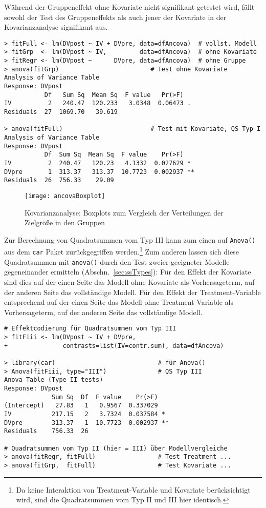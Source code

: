 Während der Gruppeneffekt ohne Kovariate nicht signifikant getestet wird, fällt sowohl der Test des Gruppeneffekts als auch jener der Kovariate in der Kovarianzanalyse signifikant aus. 
\begin{lstlisting}
> fitFull <- lm(DVpost ~ IV + DVpre, data=dfAncova)  # vollst. Modell
> fitGrp  <- lm(DVpost ~ IV,         data=dfAncova)  # ohne Kovariate
> fitRegr <- lm(DVpost ~      DVpre, data=dfAncova)  # ohne Gruppe
> anova(fitGrp)                         # Test ohne Kovariate
Analysis of Variance Table
Response: DVpost
           Df   Sum Sq  Mean Sq  F value   Pr(>F)
IV          2   240.47  120.233   3.0348  0.06473 .
Residuals  27  1069.70   39.619

> anova(fitFull)                        # Test mit Kovariate, QS Typ I
Analysis of Variance Table
Response: DVpost
           Df  Sum Sq  Mean Sq  F value    Pr(>F)
IV          2  240.47   120.23   4.1332  0.027629 *
DVpre       1  313.37   313.37  10.7723  0.002937 **
Residuals  26  756.33    29.09
\end{lstlisting}

\begin{figure}[ht]
\centering
\texttt{[image: ancovaBoxplot]}
\vspace*{-1em}
\caption{Kovarianzanalyse: Boxplots zum Vergleich der Verteilungen der Zielgröße in den Gruppen}
\label{fig:ancovaBoxplot}
\end{figure}

Zur Berechnung von Quadratsummen vom Typ III kann zum einen auf \lstinline!Anova()! aus dem \lstinline!car! Paket zurückgegriffen werden.\footnote{Da keine Interaktion von Treatment-Variable und Kovariate berücksichtigt wird, sind die Quadratsummen vom Typ II und III hier identisch.} Zum anderen lassen sich diese Quadratsummen mit \lstinline!anova()! durch den Test zweier geeigneter Modelle gegeneinander ermitteln (Abschn.\ \ref{sec:ssTypes}): Für den Effekt der Kovariate sind dies auf der einen Seite das Modell ohne Kovariate als Vorhersageterm, auf der anderen Seite das vollständige Modell. Für den Effekt der Treatment-Variable entsprechend auf der einen Seite das Modell ohne Treatment-Variable als Vorhersageterm, auf der anderen Seite das vollständige Modell.
\begin{lstlisting}
# Effektcodierung für Quadratsummen vom Typ III
> fitFiii <- lm(DVpost ~ IV + DVpre,
+               contrasts=list(IV=contr.sum), data=dfAncova)

> library(car)                            # für Anova()
> Anova(fitFiii, type="III")              # QS Typ III
Anova Table (Type II tests)
Response: DVpost
             Sum Sq  Df  F value    Pr(>F)
(Intercept)   27.83   1   0.9567  0.337029
IV           217.15   2   3.7324  0.037584 *
DVpre        313.37   1  10.7723  0.002937 **
Residuals    756.33  26

# Quadratsummen vom Typ II (hier = III) über Modellvergleiche
> anova(fitRegr, fitFull)                 # Test Treatment ...
> anova(fitGrp,  fitFull)                 # Test Kovariate ...
\end{lstlisting}

